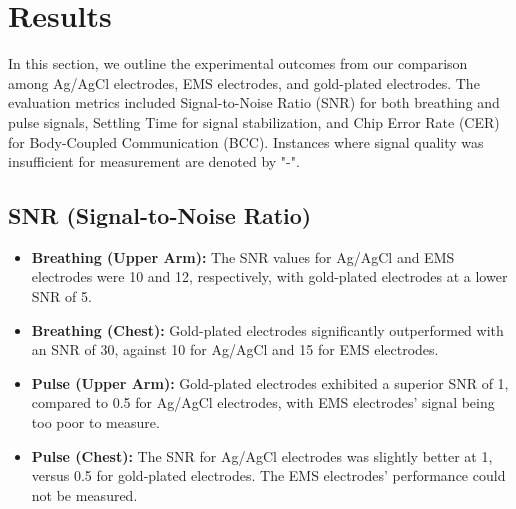 \documentclass[conference]{IEEEtran}
\begin{document}



%

\section{Results}

In this section, we outline the experimental outcomes from our comparison among Ag/AgCl electrodes, EMS electrodes, and gold-plated electrodes. The evaluation metrics included Signal-to-Noise Ratio (SNR) for both breathing and pulse signals, Settling Time for signal stabilization, and Chip Error Rate (CER) for Body-Coupled Communication (BCC). Instances where signal quality was insufficient for measurement are denoted by "-".

\subsection{SNR (Signal-to-Noise Ratio)}

\begin{itemize}
    \item \textbf{Breathing (Upper Arm):} The SNR values for Ag/AgCl and EMS electrodes were 10 and 12, respectively, with gold-plated electrodes at a lower SNR of 5.
    \item \textbf{Breathing (Chest):} Gold-plated electrodes significantly outperformed with an SNR of 30, against 10 for Ag/AgCl and 15 for EMS electrodes.
    \item \textbf{Pulse (Upper Arm):} Gold-plated electrodes exhibited a superior SNR of 1, compared to 0.5 for Ag/AgCl electrodes, with EMS electrodes' signal being too poor to measure.
    \item \textbf{Pulse (Chest):} The SNR for Ag/AgCl electrodes was slightly better at 1, versus 0.5 for gold-plated electrodes. The EMS electrodes' performance could not be measured.
\end{itemize}
\end{document}
